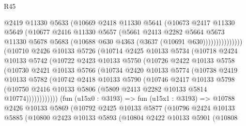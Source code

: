 \begin{lexlean}{R45}
\begin{coremodule}
                        @2419
                        @11330
                        @5633
                        (@10669
                          @2418
                          @11330
                          @5641
                          (@10673
                            @2417
                            @11330
                            @5649
                            (@10677
                              @2416
                              @11330
                              @5657
                              (@5661
                                @2413
                                @2282
                                @5664
                                @5673
                                @11330
                                @5678
                                @5683
                                (@10688 @630 @4363 (@3637 (@10691 @630)))))))))))))))
        (@10710
          @2426
          @10133
          @5726
          (@10714
            @2425
            @10133
            @5734
            (@10718
              @2424
              @10133
              @5742
              (@10722
                @2423
                @10133
                @5750
                (@10726
                  @2422
                  @10133
                  @5758
                  (@10730
                    @2421
                    @10133
                    @5766
                    (@10734
                      @2420
                      @10133
                      @5774
                      (@10738
                        @2419
                        @10133
                        @5782
                        (@10742
                          @2418
                          @10133
                          @5790
                          (@10746
                            @2417
                            @10133
                            @5798
                            (@10750
                              @2416
                              @10133
                              @5806
                              (@5809 @2413 @2282 @10133 @5814 @10774))))))))))))
        (fun (u15x0 : @3193) =>
        fun (u15x1 : @3193) =>
        @10788
          @2426
          @10133
          @5869
          (@10792
            @2425
            @10133
            @5877
            (@10796
              @2424
              @10133
              @5885
              (@10800
                @2423
                @10133
                @5893
                (@10804
                  @2422
                  @10133
                  @5901
                  (@10808

\end{coremodule}
\end{lexlean}
